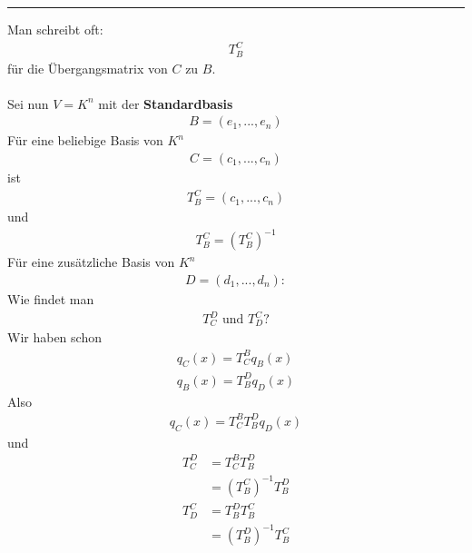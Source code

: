 \documentclass[11pt]{report}
\newcommand*\f[1] {\textbf{#1}}
\begin{document}
\vspace*{0.2cm}\rule{\linewidth}{0.3mm}\vspace{0.2cm}
Man schreibt oft:
\begin{align}
T_{B}^{C}
\end{align}
für die Übergangsmatrix von $C$ zu $B$. \\\\
Sei nun $V=K^n$ mit der \f{Standardbasis}
\begin{align}
B = (e_1, ..., e_n)
\end{align}
Für eine beliebige Basis von $K^n$
\begin{align}
C = (c_1, ..., c_n)
\end{align}
ist 
\begin{align}
T_{B}^{C} =  (c_1, ..., c_n)
\end{align}
und
\begin{align}
T_{B}^{C} = \left( T_{B}^{C}\right)^{-1}
\end{align}
Für eine zusätzliche Basis von $K^n$
\begin{align}
D = (d_1, ..., d_n):
\end{align}
Wie findet man
\begin{align}
T_{C}^{D} \text{ und } T_{D}^{C}?
\end{align}
Wir haben schon
\begin{align}
q_C(x) = T_{C}^{B} q_B(x) \\
q_B(x) = T_{B}^{D} q_D(x) 
\end{align}
Also
\begin{align}
q_C(x) = T_{C}^{B} T_{B}^{D} q_D(x)
\end{align}
und
\begin{align}
T_{C}^{D} &= T_{C}^{B} T_{B}^{D} \\
&= (T_{B}^{C})^{-1} T_{B}^{D} \\
T_{D}^{C} &= T_{B}^{D} T_{B}^{C} \\
&= (T_{B}^{D})^{-1} T_{B}^{C}
\end{align}
\end{document}
